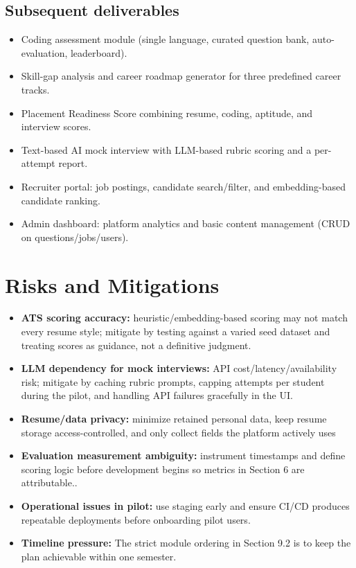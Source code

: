 \documentclass[11pt,a4paper]{article}
\begin{document}
\subsection{Subsequent deliverables}
\begin{itemize}[leftmargin=0.7cm]
    \item Coding assessment module (single language, curated question bank, auto-evaluation, leaderboard). 
    \item Skill-gap analysis and career roadmap generator for three predefined career tracks. 
    \item Placement Readiness Score combining resume, coding, aptitude, and interview scores. 
    \item Text-based AI mock interview with LLM-based rubric scoring and a per-attempt report. 
    \item Recruiter portal: job postings, candidate search/filter, and embedding-based candidate ranking. 
    \item Admin dashboard: platform analytics and basic content management (CRUD on questions/jobs/users).
\end{itemize}

\section{Risks and Mitigations}
\begin{itemize}[leftmargin=0.7cm]
    \item \textbf{ATS scoring accuracy:} heuristic/embedding-based scoring may not match every resume style; mitigate by testing against a varied seed dataset and treating scores as guidance, not a definitive judgment.
    \item \textbf{LLM dependency for mock interviews:} API cost/latency/availability risk; mitigate by caching rubric prompts, capping attempts per student during the pilot, and handling API failures gracefully in the UI.
    \item \textbf{Resume/data privacy:} minimize retained personal data, keep resume storage access-controlled, and only collect fields the platform actively uses
    \item \textbf{Evaluation measurement ambiguity:} instrument timestamps and define scoring logic before development begins so metrics in Section 6 are attributable..
    \item \textbf{Operational issues in pilot:} use staging early and ensure CI/CD produces repeatable deployments before onboarding pilot users.
    \item \textbf{Timeline pressure:} The strict module ordering in Section 9.2 is to keep the plan achievable within one semester.
\end{itemize}
\end{document}
